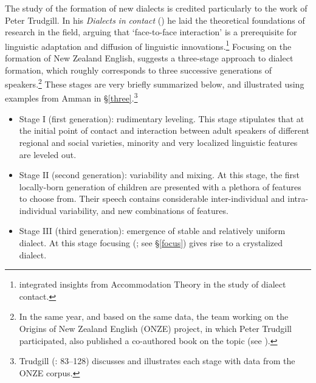 \documentclass[output=paper]{langsci/langscibook}
\begin{document}
The study of the formation of new dialects is credited particularly to the work of Peter Trudgill. In his \textit{Dialects} \textit{in} \textit{contact} (\citeyear{Trudgill1986}) he laid the theoretical foundations of research in the field, arguing that ‘face-to-face interaction’ is a prerequisite for linguistic adaptation and diffusion of linguistic innovations.\footnote{\citet{Trudgill1986} integrated insights from Accommodation Theory \citep{Giles1973} in the study of dialect contact.} Focusing on the formation of New Zealand English, \citet{Trudgill2004} suggests a three-stage approach to dialect formation, which roughly corresponds to three successive generations of speakers.\footnote{In the same year, and based on the same data, the team working on the Origins of New Zealand English (ONZE) project, in which Peter Trudgill participated, also published a co-authored book on the topic (see \citealt{GordonEtAl2004}).} These stages are very briefly summarized below, and illustrated using examples from Amman in §\ref{three}.\footnote{Trudgill (\citeyear{Trudgill2004}: 83–128) discusses and illustrates each stage with data from the ONZE corpus.}

\begin{itemize}
    \item[] 
Stage I (first generation): rudimentary leveling. This stage stipulates that at the initial point of contact and interaction between adult speakers of different regional and social varieties, minority and very localized linguistic features are leveled out.

\item[]
Stage II (second generation): variability and mixing. At this stage, the first locally-born generation of children are presented with a plethora of features to choose from. Their speech contains considerable inter-individual and intra-individual variability, and new combinations of features.

\item[] 
Stage III (third generation): emergence of stable and relatively uniform dialect. At this stage focusing (\citealt{LePageTabouret-Keller1985}; see §\ref{focus}) gives rise to a crystalized dialect. 
\end{itemize}
\end{document}
